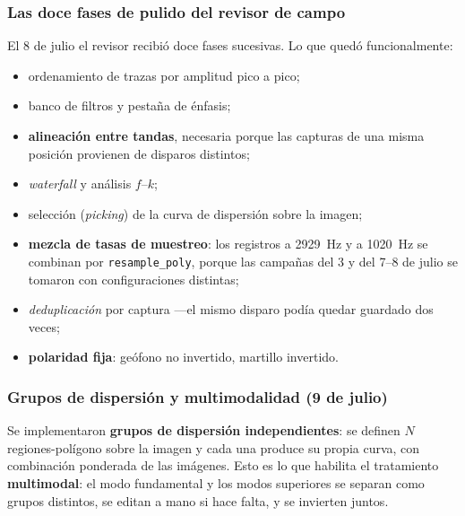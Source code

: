 \subsubsection{Las doce fases de pulido del revisor de campo}

El 8 de julio el revisor recibi\'o doce fases sucesivas. Lo que qued\'o
funcionalmente:

\begin{itemize}[itemsep=0.2em]
\item ordenamiento de trazas por amplitud pico a pico;
\item banco de filtros y pesta\~na de \'enfasis;
\item \textbf{alineaci\'on entre tandas}, necesaria porque las capturas de una
misma posici\'on provienen de disparos distintos;
\item \emph{waterfall} y an\'alisis $f$--$k$;
\item selecci\'on (\emph{picking}) de la curva de dispersi\'on sobre la imagen;
\item \textbf{mezcla de tasas de muestreo}: los registros a \SI{2929}{\hertz} y
a \SI{1020}{\hertz} se combinan por \texttt{resample\_poly}, porque las
campa\~nas del 3 y del 7--8 de julio se tomaron con configuraciones distintas;
\item \emph{deduplicaci\'on} por captura ---el mismo disparo pod\'ia quedar
guardado dos veces;
\item \textbf{polaridad fija}: ge\'ofono no invertido, martillo invertido.
\end{itemize}

\subsubsection{Grupos de dispersi\'on y multimodalidad (9 de julio)}

Se implementaron \textbf{grupos de dispersi\'on independientes}: se definen $N$
regiones-pol\'igono sobre la imagen y cada una produce su propia curva, con
combinaci\'on ponderada de las im\'agenes. Esto es lo que habilita el tratamiento
\textbf{multimodal}: el modo fundamental y los modos superiores se separan como
grupos distintos, se editan a mano si hace falta, y se invierten juntos.


